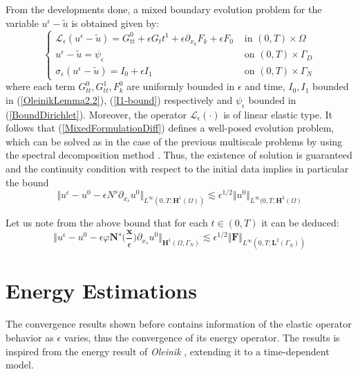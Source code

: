 From the developments done, a mixed boundary evolution problem for the variable $u^{\epsilon} - \tilde{u}$ is obtained given by:
\begin{equation}
    \label{MixedFormulationDiff}
    \left \{
    \begin{aligned}
        \mathcal{L}_{\epsilon}(u^{\epsilon} - \tilde{u}) = G_{tt}^0 + \epsilon G_tt^1 + \epsilon \partial_{x_k} F_k + \epsilon F_0   & \text{ in } (0,T) \times \Omega \\
        u^{\epsilon}-\tilde{u} = \psi_{\epsilon} & \text{ on } (0,T)\times \Gamma_D\\
        \sigma_{\epsilon}(u^{\epsilon}-\tilde{u}) = I_0 + \epsilon I_1 & \text{ on } (0,T)\times\Gamma_N
    \end{aligned}
    \right .
\end{equation}
where each term $G_{tt}^0, G_{tt}^1, F_k^0$ are uniformly bounded in $\epsilon$ and time, $I_0, I_1$ bounded in (\ref{OleinikLemma2.2}), (\ref{I1-bound}) respectively
and $\psi_{\epsilon}$ bounded in (\ref{BoundDirichlet}). Moreover, the operator $\mathcal{L}_{\epsilon}(\cdot)$ is of linear elastic type.
It follows that (\ref{MixedFormulationDiff}) defines a well-posed evolution problem, which can be solved as in the case of the previous multiscale problems by using the spectral decomposition method \cite{raviart1983introduction}. Thus, the existence of solution is guaranteed and the continuity condition with respect to the initial data implies in particular the bound
\begin{equation*}
    \Vert u^{\epsilon} - u^0 - \epsilon N^s \partial_{x_s}u^0 \Vert_{L^{\infty}(0,T; \mathbf{H}^1(\Omega))} \lesssim \epsilon^{1/2} \Vert u^0 \Vert_{L^{\infty}(0,T; \mathbf{H}^3(\Omega)}
\end{equation*}


\begin{rem}
Let us note from the above bound that for each $t \in (0,T)$ it can be deduced:
\begin{equation}
    \label{TimeBound}
    \Vert u^{\epsilon} - u^0 - \epsilon \varphi \mathbf{N}^s\big( \frac{\mathbf{x}}{\epsilon} \big) \partial_{x_s} u^0 \Vert_{\mathbf{H}^1(\Omega, \Gamma_N)} \lesssim \epsilon^{1/2} \Vert \mathbf{F}\Vert_{L^{\infty}(0,T;\mathbf{L}^{2}(\Gamma_N))}
\end{equation}
\end{rem}

\section{Energy Estimations}
The convergence results shown before contains information of the elastic operator behavior as $\epsilon$ varies, thus the convergence of its energy operator. The results is inspired from the energy result of \textit{Oleinik} \cite{oleinik1992mathematical}, extending it to a time-dependent model.

